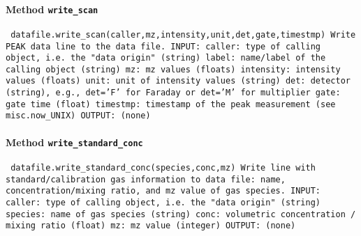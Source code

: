 \paragraph{Method \texttt{write_scan}}
\vspace{1ex}
\texttt{\newline
datafile.write_scan(caller,mz,intensity,unit,det,gate,timestmp)\newline
\newline
Write PEAK data line to the data file.\newline
\newline
INPUT:\newline
caller: type of calling object, i.e. the "data origin" (string)\newline
label: name/label of the calling object (string)\newline
mz: mz values (floats)\newline
intensity: intensity values (floats)\newline
unit: unit of intensity values (string)\newline
det: detector (string), e.g., det='F' for Faraday or det='M' for multiplier\newline
gate: gate time (float)\newline
timestmp: timestamp of the peak measurement (see misc.now_UNIX)\newline
\newline
OUTPUT:\newline
(none)\newline
\newline
}

\paragraph{Method \texttt{write_standard_conc}}
\vspace{1ex}
\texttt{\newline
datafile.write_standard_conc(species,conc,mz)\newline
\newline
Write line with standard/calibration gas information to data file: name, concentration/mixing ratio, and mz value of gas species.\newline
\newline
INPUT:\newline
caller: type of calling object, i.e. the "data origin" (string)\newline
species: name of gas species (string)\newline
conc: volumetric concentration / mixing ratio (float)\newline
mz: mz value (integer)\newline
\newline
OUTPUT:\newline
(none)\newline
\newline
}

